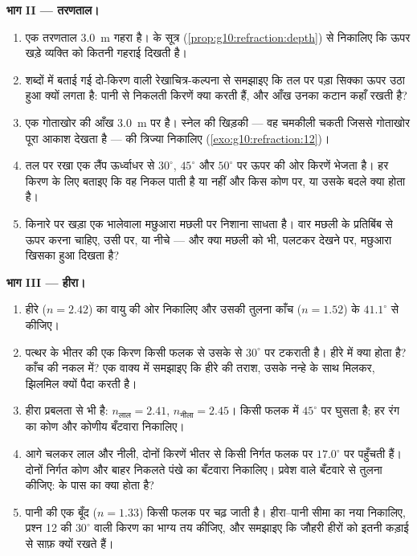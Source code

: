 \begin{problem}
\medskip
\noindent\textbf{भाग II --- तरणताल।}
\begin{enumerate}[resume]
  \item एक तरणताल \qty{3.0}{m} गहरा है।  के सूत्र (\cref{prop:g10:refraction:depth}) से
        निकालिए कि ऊपर खड़े व्यक्ति को कितनी गहराई दिखती है।
  \item शब्दों में बताई गई दो-किरण वाली रेखाचित्र-कल्पना से समझाइए कि
        तल पर पड़ा सिक्का ऊपर उठा हुआ क्यों लगता है: पानी से निकलती
        किरणें क्या करती हैं, और आँख उनका कटान कहाँ रखती है?
  \item एक गोताखोर की आँख \qty{3.0}{m} पर है। स्नेल की खिड़की --- वह चमकीली
        चकती जिससे गोताखोर पूरा आकाश देखता है --- की त्रिज्या निकालिए
        (\cref{exo:g10:refraction:12})।
  \item तल पर रखा एक लैंप ऊर्ध्वाधर से $30^\circ$, $45^\circ$ और $50^\circ$ पर
        ऊपर की ओर किरणें भेजता है। हर किरण के लिए बताइए कि वह निकल
        पाती है या नहीं और किस कोण पर, या उसके बदले क्या होता है।
  \item किनारे पर खड़ा एक भालेवाला मछुआरा मछली पर निशाना साधता है। वार
        मछली के प्रतिबिंब से ऊपर करना चाहिए, उसी पर, या नीचे --- और
        क्या मछली को भी, पलटकर देखने पर, मछुआरा खिसका हुआ दिखता है?
\end{enumerate}

\medskip
\noindent\textbf{भाग III --- हीरा।}
\begin{enumerate}[resume]
  \item हीरे ($n = 2.42$) का वायु की ओर  निकालिए और
        उसकी तुलना काँच ($n = 1.52$) के $41.1^\circ$ से कीजिए।
  \item पत्थर के भीतर की एक किरण किसी फलक से उसके  से
        $30^\circ$ पर टकराती है। हीरे में क्या होता है? काँच की नकल में?
        एक वाक्य में समझाइए कि हीरे की तराश, उसके नन्हे
         के साथ मिलकर, झिलमिल क्यों पैदा करती है।
  \item हीरा प्रबलता से  भी है: $n_{\text{लाल}} = 2.41$, $n_{\text{नीला}} = 2.45$।
         किसी फलक में $45^\circ$ पर घुसता है; हर रंग
        का  कोण और कोणीय बँटवारा निकालिए।
  \item आगे चलकर लाल और नीली, दोनों किरणें भीतर से किसी निर्गत फलक पर
        $17.0^\circ$ पर पहुँचती हैं। दोनों निर्गत कोण और बाहर निकलते पंखे का
        बँटवारा निकालिए। प्रवेश वाले बँटवारे से तुलना कीजिए:
         के पास  का क्या
        होता है?
  \item पानी की एक बूँद ($n = 1.33$) किसी फलक पर चढ़ जाती है। हीरा--पानी
        सीमा का नया  निकालिए, प्रश्न 12 की $30^\circ$
        वाली किरण का भाग्य तय कीजिए, और समझाइए कि जौहरी हीरों को इतनी
        कड़ाई से साफ़ क्यों रखते हैं।
\end{enumerate}


\end{problem}
